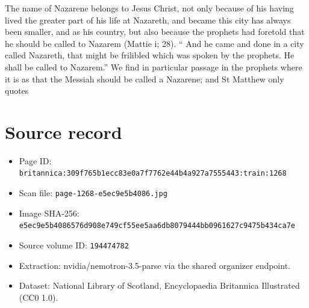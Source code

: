 \documentclass{article}
\begin{document}
The name of Nazarene belongs to Jesus Christ, not only because of his having lived the greater part of his life at Nazareth, and became this city has always been smaller, and as his country, but also because the prophets had foretold that he should be called to Nazarem (Mattie i; 28). “ And he came and done in a city called Nazareth, that might be frilibled which was spoken by the prophets. He shall be called to Nazarem.” We find in particular passage in the prophets where it is as that the Messiah should be called a Nazarene; and St Matthew only quotes

\section*{Source record}
\begin{itemize}
\item Page ID: \texttt{britannica:309f765b1ecc83e0a7f7762e44b4a927a7555443:train:1268}
\item Scan file: \texttt{page-1268-e5ec9e5b4086.jpg}
\item Image SHA-256: \texttt{e5ec9e5b4086576d908e749cf55ee5aa6db8079444bb0961627c9475b434ca7e}
\item Source volume ID: \texttt{194474782}
\item Extraction: nvidia/nemotron-3.5-parse via the shared organizer endpoint.
\item Dataset: National Library of Scotland, Encyclopaedia Britannica Illustrated (CC0 1.0).
\end{itemize}
\end{document}
